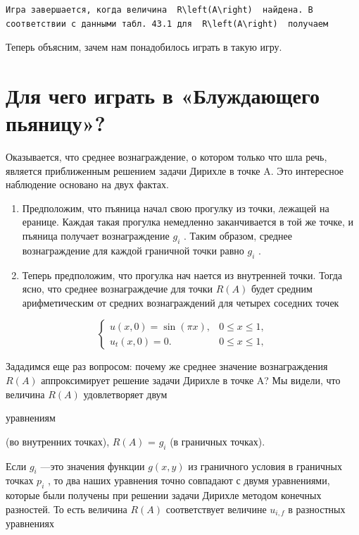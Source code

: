 \documentclass[
  ukrainian,
]{article}
\begin{document}
\begin{verbatim}
Игра завершается, когда величина  R\left(A\right)  найдена. В соответствии с данными табл. 43.1 для  R\left(A\right)  получаем
\end{verbatim}

Теперь объясним, зачем нам понадобилось играть в такую игру.

\section{Для чего играть в «Блуждающего
пьяницу»?}\label{ux434ux43bux44f-ux447ux435ux433ux43e-ux438ux433ux440ux430ux442ux44c-ux432-ux431ux43bux443ux436ux434ux430ux44eux449ux435ux433ux43e-ux43fux44cux44fux43dux438ux446ux443}

Оказывается, что среднее вознаграждение, о котором только что шла речь,
является приближенным решением задачи Дирихле в точке A. Это интересное
наблюдение основано на двух фактах.

\begin{enumerate}
\def\labelenumi{\arabic{enumi}.}
\item
  Предположим, что пъяница начал свою прогулку из точки, лежащей на
  еранице. Каждая такая прогулка немедленно заканчивается в той же
  точке, и пъяница получает вознаграждение \(g_i\) . Таким образом,
  среднее вознаграждение для каждой граничной точки равно \(g_i\) .
\item
  Теперь предположим, что прогулка нач нается из внутренней точки. Тогда
  ясно, что среднее вознаграждечие для точки \(R(A)\) будет средним
  арифметическим от средних вознаграждений для четырех соседних точек
\end{enumerate}

\[
\begin{cases} u(x, 0) = \sin(\pi x), & 0 \le x \le 1, \\ u_t(x, 0) = 0. & 0 \le x \le 1, \end{cases}
\]

Зададимся еще раз вопросом: почему же среднее значение вознаграждения
\(R(A)\) аппроксимирует решение задачи Дирихле в точке A? Мы видели, что
величина \(R(A)\) удовлетворяет двум

уравнениям

(во внутренних точках), \(R(A)\) = \(g_i\) (в граничных точках).

Если \(g_i\) ---это значения функции \(g(x, y)\) из граничного условия в
граничных точках \(p_i\) , то два наших уравнения точно совпадают с
двумя уравнениями, которые были получены при решении задачи Дирихле
методом конечных разностей. То есть величина \(R(A)\) соответствует
величине \(u_{i,f}\) в разностных уравнениях
\end{document}
